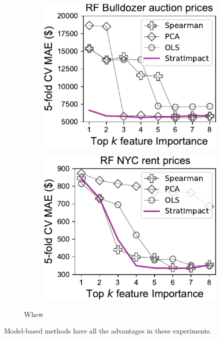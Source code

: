 \documentclass[twoside,11pt]{article}
\begin{document}
\begin{figure}
\begin{subfigure}{.24\textwidth}
    \centering
\includegraphics[scale=0.53]{images/bulldozer-topk-baseline-Importance.pdf}
\end{subfigure}
\hfill
\begin{subfigure}{.24\textwidth}
    \centering
\includegraphics[scale=0.44]{images/rent-topk-baseline-Importance.pdf}
\end{subfigure}
\caption{Whew}
\label{fig:baseline}
\end{figure}

Model-based methods have all the advantages in these experiments.
\end{document}
